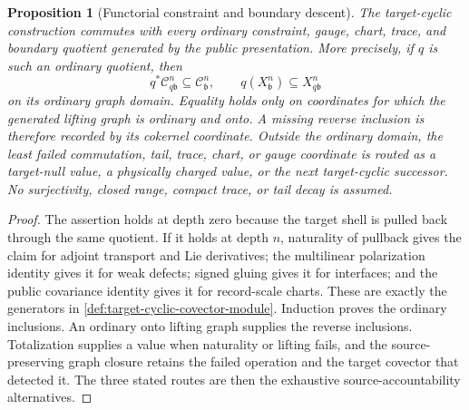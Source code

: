 \documentclass[11pt]{article}
\numberwithin{section}{part}
\theoremstyle{plain}
\newtheorem{proposition}[proposition]{Proposition}
\theoremstyle{definition}
\theoremstyle{remark}
\begin{document}
\begin{proposition}[Functorial constraint and boundary descent]
\label{prop:target-cyclic-functorial-descent}
The target-cyclic construction commutes with every ordinary constraint,
gauge, chart, trace, and boundary quotient generated by the public
presentation.  More precisely, if \(q\) is such an ordinary quotient, then
\[
 q^*\mathscr C^n_{q\mathfrak b}
 \subseteq\mathscr C^n_{\mathfrak b},
 \qquad
 q(X^n_{\mathfrak b})\subseteq X^n_{q\mathfrak b}
\]
on its ordinary graph domain.  Equality holds only on coordinates for which
the generated lifting graph is ordinary and onto.  A missing reverse
inclusion is therefore recorded by its cokernel coordinate.  Outside the
ordinary domain, the least failed commutation, tail, trace, chart, or gauge
coordinate is routed as a target-null value, a physically charged value, or
the next target-cyclic successor.  No surjectivity, closed range, compact
trace, or tail decay is assumed.
\end{proposition}

\begin{proof}
The assertion holds at depth zero because the target shell is pulled back
through the same quotient.  If it holds at depth \(n\), naturality of
pullback gives the claim for adjoint transport and Lie derivatives; the
multilinear polarization identity gives it for weak defects; signed gluing
gives it for interfaces; and the public covariance identity gives it for
record-scale charts.  These are exactly the generators in
\cref{def:target-cyclic-covector-module}.  Induction proves the ordinary
inclusions.  An ordinary onto lifting graph supplies the reverse inclusions.
Totalization supplies a value when naturality or lifting fails, and the
source-preserving graph closure retains the failed operation and the target
covector that detected it.  The three stated routes are then the exhaustive
source-accountability alternatives.
\end{proof}
\end{document}
